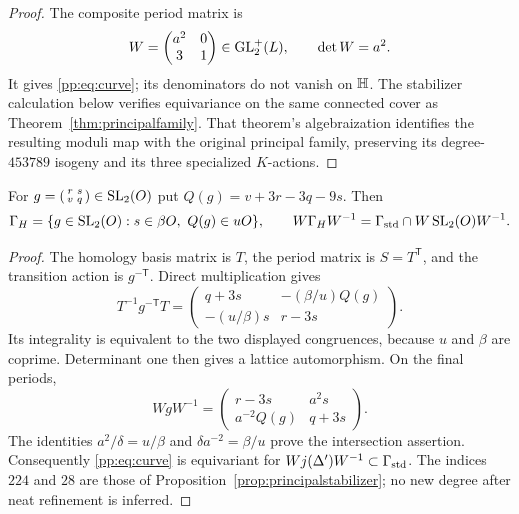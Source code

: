 \begin{proof}
The composite period matrix is
\[
 W=\begin{pmatrix}a^2&0\\3&1\end{pmatrix}\in\operatorname{GL}_2^+(L),
 \qquad \det W=a^2.
\]
It gives \eqref{pp:eq:curve}; its denominators do not vanish on $\mathbb H$.
The stabilizer calculation below verifies equivariance on the same
connected cover as Theorem~\ref{thm:principalfamily}. That theorem's
algebraization identifies the resulting moduli map with the original
principal family, preserving its degree-$453789$ isogeny and its three
specialized $K$-actions.
\end{proof}

\begin{proposition}\label{pp:prop:stabilizer}
For $g=\left(\begin{smallmatrix}r&s\\v&q\end{smallmatrix}\right)
\in\operatorname{SL}_2(O)$ put $Q(g)=v+3r-3q-9s$. Then
\[
 \Gamma_H=\{g\in\SL_2(O):s\in\beta O,\ Q(g)\in uO\},
 \qquad
 W\Gamma_HW^{-1}=\Gamma_{\rm std}\cap W\SL_2(O)W^{-1}.
\]
\end{proposition}
\begin{proof}
The homology basis matrix is $T$, the period matrix is $S=T^{\mathsf T}$,
and the transition action is $g^{-\mathsf T}$. Direct multiplication gives
\[
 T^{-1}g^{-\mathsf T}T
 =\begin{pmatrix}
 q+3s&-(\beta/u)Q(g)\\-(u/\beta)s&r-3s
 \end{pmatrix}.
\]
Its integrality is equivalent to the two displayed congruences, because
$u$ and $\beta$ are coprime. Determinant one then gives a lattice
automorphism. On the final periods,
\[
 WgW^{-1}
 =\begin{pmatrix}r-3s&a^2s\\a^{-2}Q(g)&q+3s\end{pmatrix}.
\]
The identities $a^2/\delta=u/\beta$ and $\delta a^{-2}=\beta/u$ prove
the intersection assertion. Consequently \eqref{pp:eq:curve} is
equivariant for $Wj(\Delta')W^{-1}\subset\Gamma_{\rm std}$.
The indices $224$ and $28$ are those of
Proposition~\ref{prop:principalstabilizer}; no new degree after neat
refinement is inferred.
\end{proof}

